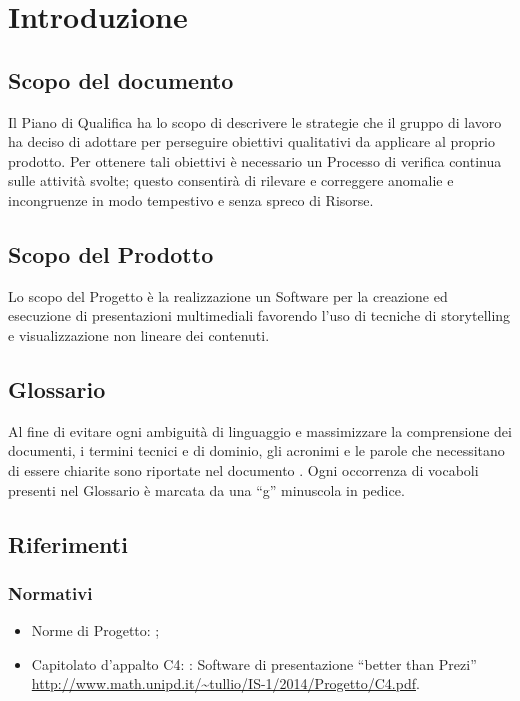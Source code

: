 \section{Introduzione}
\subsection{Scopo del documento}
Il Piano di Qualifica ha lo scopo di descrivere le strategie che il gruppo di lavoro ha deciso di adottare per perseguire obiettivi qualitativi da applicare al proprio prodotto. Per ottenere tali obiettivi è necessario un Processo di verifica continua sulle attività svolte; questo consentirà di rilevare e correggere anomalie e incongruenze in modo tempestivo e senza spreco di Risorse.
\subsection{Scopo del Prodotto}
Lo scopo del Progetto è la realizzazione un Software per la creazione ed esecuzione di presentazioni multimediali favorendo l’uso di tecniche di storytelling e visualizzazione non lineare dei contenuti.
\subsection{Glossario}
Al fine di evitare ogni ambiguità di linguaggio e massimizzare la comprensione dei documenti, i termini tecnici e di dominio, gli acronimi e le parole che necessitano di essere chiarite sono riportate nel documento \href{run:../../Esterni/\fGlossario}{\fEscapeGlossario}. Ogni occorrenza di vocaboli presenti nel Glossario è marcata da una “g” minuscola in pedice.
\subsection{Riferimenti}

\subsubsection{Normativi}
\begin{itemize}
\item Norme di Progetto: \href{run:../../Interni/\fNormeDiProgetto}{\fEscapeNormeDiProgetto};
\item Capitolato d’appalto C4: \premi: Software di presentazione “better than Prezi” \\
\url{http://www.math.unipd.it/~tullio/IS-1/2014/Progetto/C4.pdf}.
\end{itemize}
